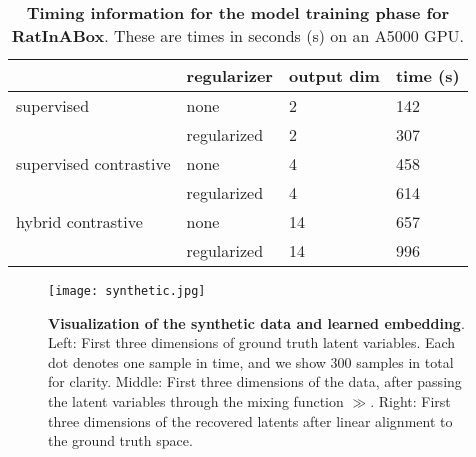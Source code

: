  
 \begin{table}[ht]
    \small
    \centering
    \caption{\textbf{Timing information for the model training phase for RatInABox}. These are times in seconds (s) on an A5000 GPU.
    }
    \label{tbl:timing-compute}
\begin{tabular}{llll}
\toprule
\textbf{}              & {regularizer} & {output dim} & {time (s)} \\
\midrule
supervised             & none                 & 2                  & 142        \\
                       & regularized          & 2                  & 307        \\
supervised contrastive & none                 & 4                  & 458        \\
                       & regularized          & 4                  & 614        \\
hybrid contrastive     & none                 & 14                 & 657        \\
                       & regularized          & 14                 & 996 \\
\bottomrule
\end{tabular}
\end{table}




\begin{figure*}[b]
    \centering
    \texttt{[image: synthetic.jpg]}
    \vspace{-5pt}
    \caption{\textbf{Visualization of the synthetic data and learned embedding}.
    Left: First three dimensions of ground truth latent variables. Each dot denotes one sample in time, and we show 300 samples in total for clarity.
    Middle: First three dimensions of the data, after passing the latent variables through the mixing function $\gg$.
    Right: First three dimensions of the recovered latents after linear alignment to the ground truth space.
    }
    \label{figure:synthetic-data}
\end{figure*}

